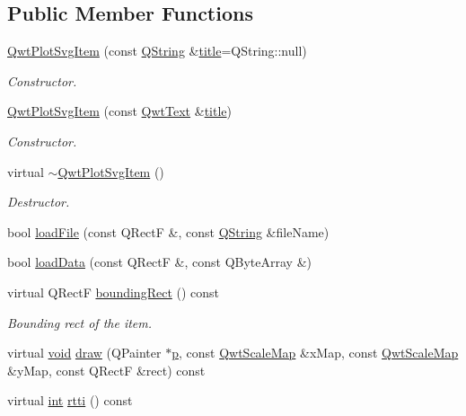 \subsection*{Public Member Functions}
\begin{DoxyCompactItemize}
\item 
\hyperlink{class_qwt_plot_svg_item_a3b6e505f0ef1d9e40030db2a8b60762e}{Qwt\-Plot\-Svg\-Item} (const \hyperlink{group___u_a_v_objects_plugin_gab9d252f49c333c94a72f97ce3105a32d}{Q\-String} \&\hyperlink{class_qwt_plot_item_a3859d011b670b5f89e45d1ccef9206f7}{title}=Q\-String\-::null)
\begin{DoxyCompactList}\small\item\em Constructor. \end{DoxyCompactList}\item 
\hyperlink{class_qwt_plot_svg_item_ac750a4ff902302ab485971fcea6bee38}{Qwt\-Plot\-Svg\-Item} (const \hyperlink{class_qwt_text}{Qwt\-Text} \&\hyperlink{class_qwt_plot_item_a3859d011b670b5f89e45d1ccef9206f7}{title})
\begin{DoxyCompactList}\small\item\em Constructor. \end{DoxyCompactList}\item 
virtual \hyperlink{class_qwt_plot_svg_item_a4509baf861772124c71abd1b6514b319}{$\sim$\-Qwt\-Plot\-Svg\-Item} ()
\begin{DoxyCompactList}\small\item\em Destructor. \end{DoxyCompactList}\item 
bool \hyperlink{class_qwt_plot_svg_item_aca9592f3d3dca512b7970851b159cf57}{load\-File} (const Q\-Rect\-F \&, const \hyperlink{group___u_a_v_objects_plugin_gab9d252f49c333c94a72f97ce3105a32d}{Q\-String} \&file\-Name)
\item 
bool \hyperlink{class_qwt_plot_svg_item_a9e611f0c845289ddfb9758fa4479e719}{load\-Data} (const Q\-Rect\-F \&, const Q\-Byte\-Array \&)
\item 
virtual Q\-Rect\-F \hyperlink{class_qwt_plot_svg_item_af358905da83fb1c67631b7fba9539daa}{bounding\-Rect} () const 
\begin{DoxyCompactList}\small\item\em Bounding rect of the item. \end{DoxyCompactList}\item 
virtual \hyperlink{group___u_a_v_objects_plugin_ga444cf2ff3f0ecbe028adce838d373f5c}{void} \hyperlink{class_qwt_plot_svg_item_a83a95b772cc79f9a1590e0c4fe73d39c}{draw} (Q\-Painter $\ast$\hyperlink{glext_8h_aa5367c14d90f462230c2611b81b41d23}{p}, const \hyperlink{class_qwt_scale_map}{Qwt\-Scale\-Map} \&x\-Map, const \hyperlink{class_qwt_scale_map}{Qwt\-Scale\-Map} \&y\-Map, const Q\-Rect\-F \&rect) const 
\item 
virtual \hyperlink{ioapi_8h_a787fa3cf048117ba7123753c1e74fcd6}{int} \hyperlink{class_qwt_plot_svg_item_a4331deca8a2ecdd6a7ebe1be7de22969}{rtti} () const 
\end{DoxyCompactItemize}
